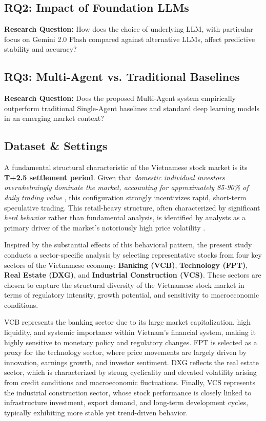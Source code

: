 \documentclass{ieeeaccess}
\begin{document}
\subsection{RQ2: Impact of Foundation LLMs}

\textbf{Research Question:} How does the choice of underlying LLM, with particular focus on Gemini 2.0 Flash compared against alternative LLMs, affect predictive stability and accuracy?

\subsection{RQ3: Multi-Agent vs. Traditional Baselines}

\textbf{Research Question:} Does the proposed Multi-Agent system empirically outperform traditional Single-Agent baselines and standard deep learning models in an emerging market context?



\subsection{Dataset \& Settings}
A fundamental structural characteristic of the Vietnamese stock market is its \textbf{T+2.5 settlement period}. Given that \textit{domestic individual investors overwhelmingly dominate the market, accounting for approximately 85-90\% of daily trading value} \cite{TinNhanhChungkhoan2025}, this configuration strongly incentivizes rapid, short-term speculative trading. This retail-heavy structure, often characterized by significant \textit{herd behavior} rather than fundamental analysis, is identified by analysts as a primary driver of the market's notoriously high price volatility \cite{WorldBank2024, Yuanta2025}.



Inspired by the substantial effects of this behavioral pattern, the present study conducts a sector-specific analysis by selecting representative stocks from four key sectors of the Vietnamese economy: \textbf{Banking (VCB)}, \textbf{Technology (FPT)}, \textbf{Real Estate (DXG)}, and \textbf{Industrial Construction (VCS)}. These sectors are chosen to capture the structural diversity of the Vietnamese stock market in terms of regulatory intensity, growth potential, and sensitivity to macroeconomic conditions.

VCB represents the banking sector due to its large market capitalization, high liquidity, and systemic importance within Vietnam’s financial system, making it highly sensitive to monetary policy and regulatory changes. FPT is selected as a proxy for the technology sector, where price movements are largely driven by innovation, earnings growth, and investor sentiment. DXG reflects the real estate sector, which is characterized by strong cyclicality and elevated volatility arising from credit conditions and macroeconomic fluctuations. Finally, VCS represents the industrial construction sector, whose stock performance is closely linked to infrastructure investment, export demand, and long-term development cycles, typically exhibiting more stable yet trend-driven behavior.
\end{document}
